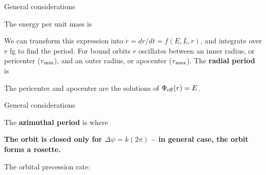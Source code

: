 \documentclass[letterpaper,landscape]{slides}
\begin{document}
\begin{slide}
\begin{center}
{\large \color{red} 
                   General considerations   }
\end{center}

The energy per unit mass is

We can transform this expression into $\dot r = dr/dt = f(E, L, r)$, and
integrate over $r$ fg
to find the period. For bound orbits $r$ oscillates between an inner radius, or {\color{red} pericenter}
($r_{\rm min}$), and an outer radius, or {\color{red} apocenter} ($r_{\rm max}$). The
{\bf radial period} is 

The pericenter and apocenter are the solutions of $\Phi_{\rm eff}(r) = E$.

\vfill
\end{slide}



\begin{slide}
\begin{center}
{\large \color{red} 
                   General considerations   }
\end{center}

The {\bf azimuthal period} is 
where

{\bf The orbit is closed only for $\Delta \psi = k (2\pi)$ -- in general case,
the orbit forms a rosette.}

{\color{red} The orbital precession rate:}

\vfill
\end{slide}
\end{document}
